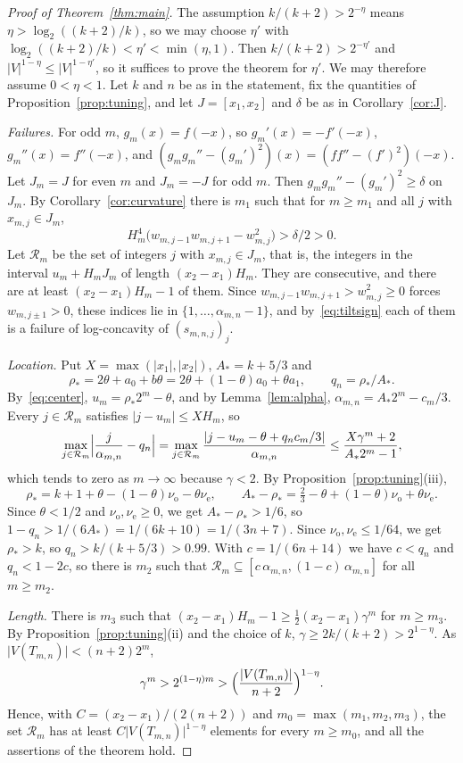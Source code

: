 \documentclass{amsart}
\theoremstyle{definition}
\theoremstyle{remark}
\numberwithin{equation}{section}
\newcommand{\nuo}{\nu_{\mathrm{o}}}
\newcommand{\nue}{\nu_{\mathrm{e}}}
\newcommand{\abs}[1]{\lvert #1\rvert}
\begin{document}
\begin{proof}[Proof of Theorem~\ref{thm:main}]
The assumption $k/(k+2)>2^{-\eta}$ means $\eta>\log_2((k+2)/k)$, so we may choose $\eta'$ with $\log_2((k+2)/k)<\eta'<\min(\eta,1)$. Then $k/(k+2)>2^{-\eta'}$ and $\abs V^{1-\eta}\le\abs V^{1-\eta'}$, so it suffices to prove the theorem for $\eta'$. We may therefore assume $0<\eta<1$. Let $k$ and $n$ be as in the statement, fix the quantities of Proposition~\ref{prop:tuning}, and let $J=[x_1,x_2]$ and $\delta$ be as in Corollary~\ref{cor:J}.

\emph{Failures.} For odd $m$, $g_m(x)=f(-x)$, so $g_m'(x)=-f'(-x)$, $g_m''(x)=f''(-x)$, and $(g_mg_m''-(g_m')^2)(x)=(ff''-(f')^2)(-x)$. Let $J_m=J$ for even $m$ and $J_m=-J$ for odd $m$. Then $g_mg_m''-(g_m')^2\ge\delta$ on $J_m$. By Corollary~\ref{cor:curvature} there is $m_1$ such that for $m\ge m_1$ and all $j$ with $x_{m,j}\in J_m$,
\[
H_m^4\bigl(w_{m,j-1}w_{m,j+1}-w_{m,j}^2\bigr)>\delta/2>0 .
\]
Let $\mathcal R_m$ be the set of integers $j$ with $x_{m,j}\in J_m$, that is, the integers in the interval $u_m+H_mJ_m$ of length $(x_2-x_1)H_m$. They are consecutive, and there are at least $(x_2-x_1)H_m-1$ of them. Since $w_{m,j-1}w_{m,j+1}>w_{m,j}^2\ge0$ forces $w_{m,j\pm1}>0$, these indices lie in $\{1,\dots,\alpha_{m,n}-1\}$, and by~\eqref{eq:tiltsign} each of them is a failure of log-concavity of $(s_{m,n,j})_j$.

\emph{Location.} Put $X=\max(\abs{x_1},\abs{x_2})$, $A_*=k+5/3$ and
\[
\rho_*=2\theta+a_0+b\theta=2\theta+(1-\theta)a_0+\theta a_1,\qquad q_n=\rho_*/A_* .
\]
By~\eqref{eq:center}, $u_m=\rho_*2^m-\theta$, and by Lemma~\ref{lem:alpha}, $\alpha_{m,n}=A_*2^m-c_m/3$. Every $j\in\mathcal R_m$ satisfies $\abs{j-u_m}\le XH_m$, so
\[
\max_{j\in\mathcal R_m}\Bigl\lvert\frac{j}{\alpha_{m,n}}-q_n\Bigr\rvert
=\max_{j\in\mathcal R_m}\frac{\abs{j-u_m-\theta+q_nc_m/3}}{\alpha_{m,n}}
\le\frac{X\gamma^m+2}{A_*2^m-1},
\]
which tends to zero as $m\to\infty$ because $\gamma<2$. By Proposition~\ref{prop:tuning}(iii),
\[
\rho_*=k+1+\theta-(1-\theta)\nuo-\theta\nue,\qquad A_*-\rho_*=\tfrac23-\theta+(1-\theta)\nuo+\theta\nue .
\]
Since $\theta<1/2$ and $\nuo,\nue\ge0$, we get $A_*-\rho_*>1/6$, so $1-q_n>1/(6A_*)=1/(6k+10)=1/(3n+7)$. Since $\nuo,\nue\le1/64$, we get $\rho_*>k$, so $q_n>k/(k+5/3)>0.99$. With $c=1/(6n+14)$ we have $c<q_n$ and $q_n<1-2c$, so there is $m_2$ such that $\mathcal R_m\subseteq[c\,\alpha_{m,n},(1-c)\,\alpha_{m,n}]$ for all $m\ge m_2$.

\emph{Length.} There is $m_3$ such that $(x_2-x_1)H_m-1\ge\tfrac12(x_2-x_1)\gamma^m$ for $m\ge m_3$. By Proposition~\ref{prop:tuning}(ii) and the choice of $k$, $\gamma\ge2k/(k+2)>2^{1-\eta}$. As $\abs{V(T_{m,n})}<(n+2)2^m$,
\[
\gamma^m>2^{(1-\eta)m}>\Bigl(\frac{\abs{V(T_{m,n})}}{n+2}\Bigr)^{1-\eta}.
\]
Hence, with $C=(x_2-x_1)/(2(n+2))$ and $m_0=\max(m_1,m_2,m_3)$, the set $\mathcal R_m$ has at least $C\abs{V(T_{m,n})}^{1-\eta}$ elements for every $m\ge m_0$, and all the assertions of the theorem hold.
\end{proof}
\end{document}
